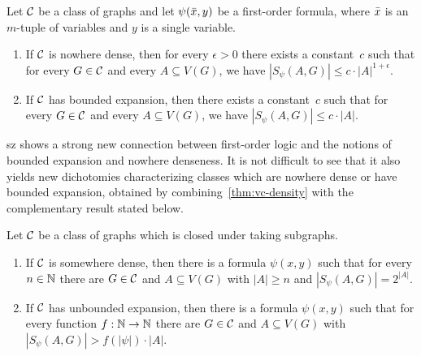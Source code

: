 \begin{theorem}\label{thm:vc-density}
Let $\mathcal{C}$ be a class of graphs and let $\psi(\bar{x},y)$ be a first-order formula, where 
$\bar{x}$ is an $m$-tuple of variables and $y$ is a single variable. 
\begin{enumerate}
\item If $\mathcal{C}$ is nowhere dense, then for every $\epsilon>0$ 
there exists a constant~$c$ such that for every $G\in \mathcal{C}$ and every
$A\subseteq V(G)$, we have $|S_\psi(A,G)|\leq c\cdot |A|^{1+\epsilon}.$

\item If $\mathcal{C}$ has bounded expansion, then there exists a constant~$c$ such that for every $G\in \mathcal{C}$ and every $A\subseteq V(G)$, we have $|S_\psi(A,G)|\leq c\cdot |A|$.
\end{enumerate}
\end{theorem}




\begin{change}{sz}
 shows a strong new connection 
	between first-order logic and the notions of bounded expansion
	and nowhere denseness.
	It is not difficult to see that it also yields new dichotomies 
characterizing classes which are nowhere dense  or have bounded expansion, obtained by combining~\cref{thm:vc-density}
with the complementary result stated below.

\begin{theorem}\label{thm:vc-density-lower-bound}
Let $\mathcal{C}$ be a class of graphs which 
is closed under taking subgraphs. 
\begin{enumerate}
\item If $\mathcal{C}$ is somewhere dense, then there is a formula 
$\psi(x,y)$ such that for every $n\in \mathbb{N}$ there are $G\in\mathcal{C}$ and $A\subseteq V(G)$ 
with $|A|\geq n$ and $|S_\psi(A,G)|=2^{|A|}$. 
\item If $\mathcal{C}$ has unbounded expansion, then there is a formula 
$\psi(x,y)$ such that for every function $f:\mathbb{N}\rightarrow \mathbb{N}$ 
there are $G\in\mathcal{C}$ and $A\subseteq V(G)$ 
with $|S_\psi(A,G)|>f(|\psi|)\cdot |A|$. 
\end{enumerate}
\end{theorem}
\end{change}




